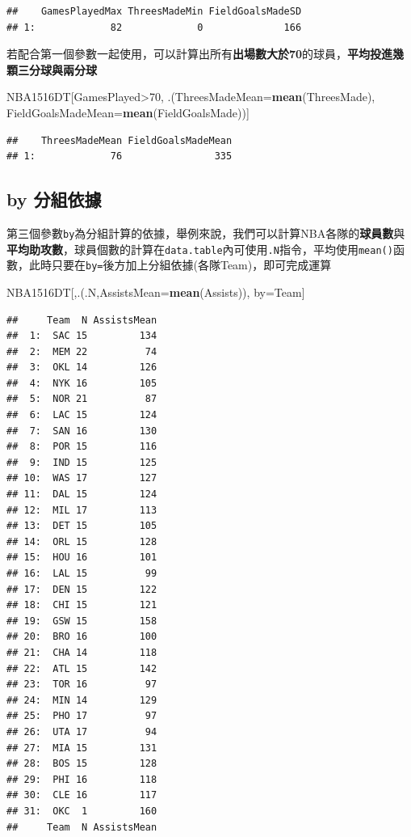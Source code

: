 \documentclass[]{book}
\newenvironment{Shaded}{\begin{snugshade}}{\end{snugshade}}
\newcommand{\KeywordTok}[1]{\textcolor[rgb]{0.13,0.29,0.53}{\textbf{{#1}}}}
\newcommand{\DataTypeTok}[1]{\textcolor[rgb]{0.13,0.29,0.53}{{#1}}}
\newcommand{\DecValTok}[1]{\textcolor[rgb]{0.00,0.00,0.81}{{#1}}}
\newcommand{\NormalTok}[1]{{#1}}
\theoremstyle{definition}
\theoremstyle{definition}
\theoremstyle{remark}
\begin{document}
\begin{verbatim}
##    GamesPlayedMax ThreesMadeMin FieldGoalsMadeSD
## 1:             82             0              166
\end{verbatim}

若配合第一個參數一起使用，可以計算出所有\textbf{出場數大於70}的球員，\textbf{平均投進幾顆三分球與兩分球}

\begin{Shaded}
\begin{Highlighting}[]
\NormalTok{NBA1516DT[GamesPlayed>}\DecValTok{70}\NormalTok{,}
          \NormalTok{.(}\DataTypeTok{ThreesMadeMean=}\KeywordTok{mean}\NormalTok{(ThreesMade), }\DataTypeTok{FieldGoalsMadeMean=}\KeywordTok{mean}\NormalTok{(FieldGoalsMade))]}
\end{Highlighting}
\end{Shaded}

\begin{verbatim}
##    ThreesMadeMean FieldGoalsMadeMean
## 1:             76                335
\end{verbatim}

\subsection{by 分組依據}\label{by-}

第三個參數\texttt{by}為分組計算的依據，舉例來說，我們可以計算NBA各隊的\textbf{球員數}與\textbf{平均助攻數}，球員個數的計算在\texttt{data.table}內可使用\texttt{.N}指令，平均使用\texttt{mean()}函數，此時只要在\texttt{by=}後方加上分組依據(各隊Team)，即可完成運算

\begin{Shaded}
\begin{Highlighting}[]
\NormalTok{NBA1516DT[,.(.N,}\DataTypeTok{AssistsMean=}\KeywordTok{mean}\NormalTok{(Assists)),}
          \NormalTok{by=Team]}
\end{Highlighting}
\end{Shaded}

\begin{verbatim}
##     Team  N AssistsMean
##  1:  SAC 15         134
##  2:  MEM 22          74
##  3:  OKL 14         126
##  4:  NYK 16         105
##  5:  NOR 21          87
##  6:  LAC 15         124
##  7:  SAN 16         130
##  8:  POR 15         116
##  9:  IND 15         125
## 10:  WAS 17         127
## 11:  DAL 15         124
## 12:  MIL 17         113
## 13:  DET 15         105
## 14:  ORL 15         128
## 15:  HOU 16         101
## 16:  LAL 15          99
## 17:  DEN 15         122
## 18:  CHI 15         121
## 19:  GSW 15         158
## 20:  BRO 16         100
## 21:  CHA 14         118
## 22:  ATL 15         142
## 23:  TOR 16          97
## 24:  MIN 14         129
## 25:  PHO 17          97
## 26:  UTA 17          94
## 27:  MIA 15         131
## 28:  BOS 15         128
## 29:  PHI 16         118
## 30:  CLE 16         117
## 31:  OKC  1         160
##     Team  N AssistsMean
\end{verbatim}
\end{document}
